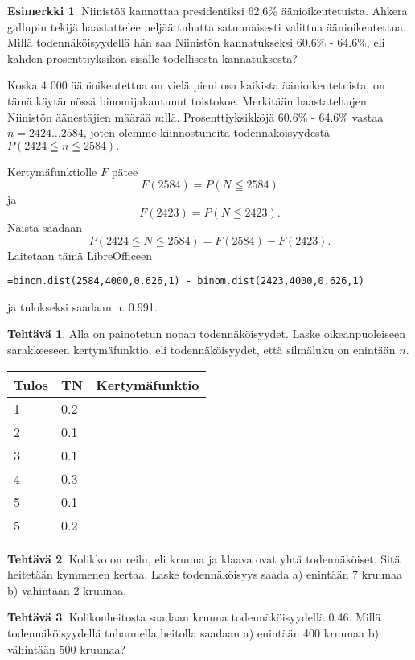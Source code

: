 \documentclass[12pt,leqno,a4paper,oneside]{amsart}
\theoremstyle{definition}
\newtheorem{example}[proclaim]{Esimerkki}
\newtheorem{exercise}{Tehtävä}
\theoremstyle{remark}
\numberwithin{equation}{section}
\begin{document}
\begin{example}
 Niinistöä kannattaa presidentiksi 62,6\% äänioikeutetuista. Ahkera gallupin tekijä haastattelee neljää tuhatta 
 satunnaisesti valittua äänioikeutettua. Millä todennäköisyydellä
 hän saa Niinistön kannatukseksi 60.6\% - 64.6\%, eli kahden prosenttiyksikön sisälle todellisesta kannatuksesta?
 
 Koska 4 000 äänioikeutettua on vielä pieni osa kaikista äänioikeutetuista, on tämä käytännössä binomijakautunut toistokoe.
 Merkitään haas\-ta\-tel\-tu\-jen Niinistön äänestäjien määrää $n$:llä. 
 Prosenttiyksikköjä 60.6\% - 64.6\% vastaa $n= 2 424 \ldots 2 584$, joten olemme kiinnostuneita
 todennäköisyydestä $P( 2424\leqq n \leqq 2584).$ 
 
 Kertymäfunktiolle $F$ pätee
 $$F(2 584) = P(N \leqq 2584)$$
 ja
 $$F(2 423) = P(N \leqq 2423) .$$
 Näistä saadaan
 $$P( 2424\leqq N \leqq 2584) = F(2584)-F(2423).$$
 Laitetaan tämä LibreOfficeen 
 \begin{center}
 \mbox{\texttt{=binom.dist(2584,4000,0.626,1) - binom.dist(2423,4000,0.626,1)}}
 \end{center}
 ja tulokseksi saadaan n. 0.991.
\end{example}

\begin{exercise}
 Alla on painotetun nopan todennäköisyydet. Laske oikeanpuoleiseen sarakkeeseen kertymäfunktio, eli todennäköisyydet, että
 silmäluku on enintään $n.$\\
 \begin{center}
\begin{tabular}{l|l|l}
Tulos &TN &Kertymäfunktio\\
\hline
1 &0.2&\\
2 &0.1&\\
3 &0.1&\\
4 &0.3&\\
5 &0.1&\\
5 &0.2&
\end{tabular}
\end{center}
\end{exercise}

\begin{exercise}
 Kolikko on reilu, eli kruuna ja klaava ovat yhtä todennäköiset. Sitä heitetään kymmenen kertaa. Laske todennäköisyys
 saada a) enintään 7 kruunaa b) vähintään 2 kruunaa. 
\end{exercise}



\begin{exercise}
Kolikonheitosta saadaan kruuna todennäköisyydellä 0.46. Millä todennäköisyydellä tuhannella heitolla saadaan
a) enintään 400 kruunaa b) vähintään 500 kruunaa?
\end{exercise}
\end{document}
